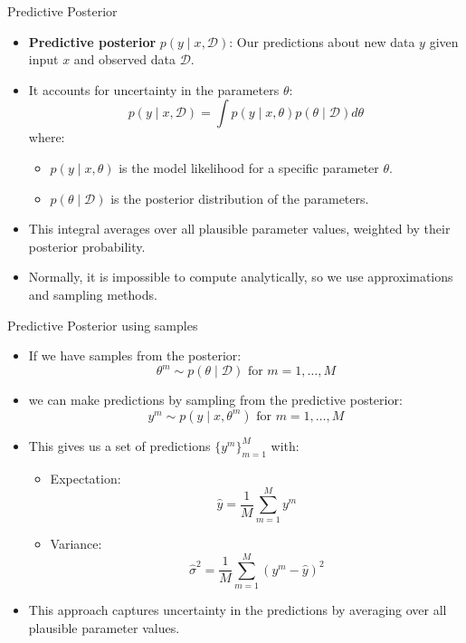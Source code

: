 \documentclass{beamer}
\begin{document}
\begin{frame}{Predictive Posterior}
  \begin{itemize}
    \item \textbf{Predictive posterior} $p(y \mid x, \mathcal{D})$: Our predictions about new data $y$ given input $x$ and observed data $\mathcal{D}$.
    \item It accounts for uncertainty in the parameters $\theta$:
    \[
      p(y \mid x, \mathcal{D}) = \int p(y \mid x, \theta) p(\theta \mid \mathcal{D}) d\theta
    \]
    where:
    \begin{itemize}
      \item $p(y \mid x, \theta)$ is the model likelihood for a specific parameter $\theta$.
      \item $p(\theta \mid \mathcal{D})$ is the posterior distribution of the parameters.
    \end{itemize}
  \item This integral averages over all plausible parameter values, weighted by their posterior probability.
  \item Normally, it is impossible to compute analytically, so we use approximations and sampling methods.
    \end{itemize}
  \end{frame}

  \begin{frame}{Predictive Posterior using samples}
  \begin{itemize}
  \item If we have samples from the posterior:
    \[ \theta^m \sim p(\theta \mid \mathcal{D}) \text{ for } m = 1, \ldots, M \]

  \item
    we can make predictions by sampling from the predictive posterior:
    \[
      y^m \sim p(y \mid x, \theta^m) \text{ for } m = 1, \ldots, M
    \]
  \item This gives us a set of predictions $\{y^m\}_{m=1}^M$ with:
    \begin{itemize}
      \item Expectation:
        \[
          \hat{y} = \frac{1}{M} \sum_{m=1}^M y^m
        \]
      \item Variance:
        \[
          \hat{\sigma}^2 = \frac{1}{M} \sum_{m=1}^M (y^m - \hat{y})^2
        \]
    \end{itemize}
  \item This approach captures uncertainty in the predictions by averaging over all plausible parameter values.
    \end{itemize}
\end{frame}
\end{document}
